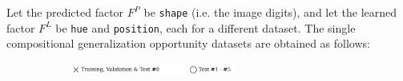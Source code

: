 \begin{definition}
\begin{figure}[H]
\begin{subfigure}[b]{0.45\textwidth}
\begin{subfigure}[b]{0.48\textwidth}
            \end{subfigure}
        \end{subfigure}
    \end{figure}
\end{definition}

\begin{definition}\label{def:1_cgo_experiments}
    Let the predicted factor $F^P$ be \texttt{shape} (i.e. the image digits), and let the 
    learned factor $F^L$ be \texttt{hue} and \texttt{position}, each for a different dataset. The 
    single compositional generalization opportunity datasets are obtained as follows:

    \begin{figure}[H]
        \centering
        \begin{subfigure}[b]{\textwidth}
            \centering
            \includegraphics[width=0.6\textwidth]{img/datasets/_legend.pdf}
        \end{subfigure}
        \vspace{-0.2cm} %


\end{figure}
\end{definition}
